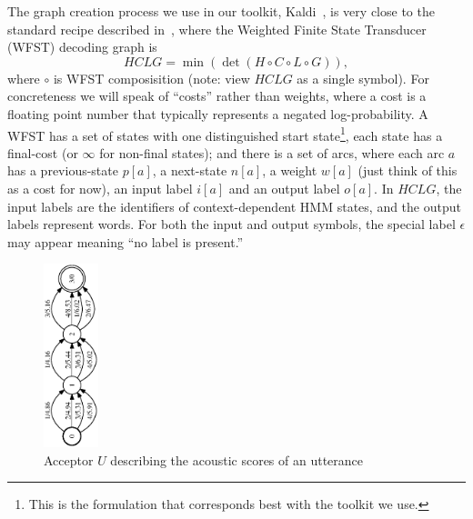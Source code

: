 \documentclass{article}
\def\HCLG{{\mathit{HCLG}}}
\begin{document}
The graph creation process we use in our toolkit, Kaldi~\cite{kaldi_paper},
is very close to the standard recipe described in~\cite{wfst},
where the Weighted Finite State Transducer (WFST) decoding graph is
\begin{equation}
  \HCLG = \min(\det(H \circ C \circ L \circ G)),
\end{equation}
where $\circ$ is WFST composisition (note: view $\HCLG$ as a single symbol).  
For concreteness we will speak of ``costs'' rather
than weights, where a cost is a floating point number that typically represents a negated
log-probability.  A WFST has a set of states with one distinguished
start state\footnote{This is the formulation that corresponds best with the toolkit we use.},
each state has a final-cost (or $\infty$ for non-final states);
and there is a set of arcs, where each arc $a$ has a previous-state $p[a]$, a next-state $n[a]$, a
weight $w[a]$ (just think of this as a cost for now), an input label $i[a]$ and an output
label $o[a]$.  In $\HCLG$, the input labels are the identifiers of context-dependent
HMM states, and the output labels represent words.  For both the input and output
symbols, the special label $\epsilon$ may appear meaning ``no label is present.''


\begin{figure}
\begin{center}
\includegraphics[height=2.1in,angle=270]{figures/acceptor_utterance.eps}
  \caption{Acceptor $U$ describing the acoustic scores of an utterance}
\label{fig:acceptor}
\end{center}
\end{figure}
\end{document}
